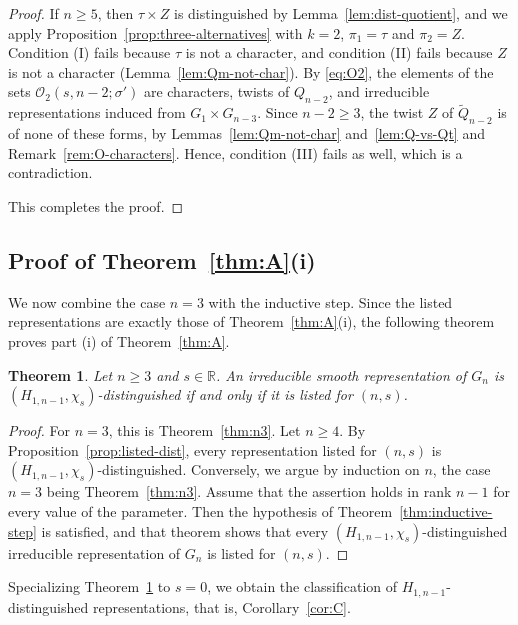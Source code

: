 \documentclass[11pt]{amsart}
\numberwithin{equation}{section}
\theoremstyle{plain}
\newtheorem{theorem}{Theorem}[section]
\theoremstyle{definition}
\theoremstyle{remark}
\newcommand{\R}{\mathbb{R}}
\newcommand{\Qt}{\widetilde{Q}}
\begin{document}
\begin{proof}
	If $n\ge5$, then $\tau\times Z$ is distinguished by Lemma~\ref{lem:dist-quotient}, and we apply Proposition~\ref{prop:three-alternatives} with $k=2$, $\pi_1=\tau$ and $\pi_2=Z$. Condition (I) fails because $\tau$ is not a character, and condition (II) fails because $Z$ is not a character (Lemma~\ref{lem:Qm-not-char}). By \eqref{eq:O2}, the elements of the sets $\mathcal O_2(s,n-2;\sigma')$ are characters, twists of $Q_{n-2}$, and irreducible representations induced from $G_1\times G_{n-3}$. Since $n-2\ge3$, the twist $Z$ of $\Qt_{n-2}$ is of none of these forms, by Lemmas~\ref{lem:Qm-not-char} and~\ref{lem:Q-vs-Qt} and Remark~\ref{rem:O-characters}. Hence, condition (III) fails as well, which is a contradiction.
	
	This completes the proof.
\end{proof}

\subsection{Proof of Theorem~\ref{thm:A}(i)}\label{ss:proof-Ai}

We now combine the case $n=3$ with the inductive step. Since the listed representations are exactly those of Theorem~\ref{thm:A}(i), the following theorem proves part (i) of Theorem~\ref{thm:A}.

\begin{theorem}\label{thm:classification-all}
	Let $n\ge3$ and $s\in\R$. An irreducible smooth representation of $G_n$ is $(H_{1,n-1},\chi_s)$-distinguished if and only if it is listed for $(n,s)$.
\end{theorem}

\begin{proof}
	For $n=3$, this is Theorem~\ref{thm:n3}. Let $n\ge4$. By Proposition~\ref{prop:listed-dist}, every representation listed for $(n,s)$ is $(H_{1,n-1},\chi_s)$-distinguished. Conversely, we argue by induction on $n$, the case $n=3$ being Theorem~\ref{thm:n3}. Assume that the assertion holds in rank $n-1$ for every value of the parameter. Then the hypothesis of Theorem~\ref{thm:inductive-step} is satisfied, and that theorem shows that every $(H_{1,n-1},\chi_s)$-distinguished irreducible representation of $G_n$ is listed for $(n,s)$.
\end{proof}

Specializing Theorem~\ref{thm:classification-all} to $s=0$, we obtain the classification of $H_{1,n-1}$-distinguished representations, that is, Corollary~\ref{cor:C}.
\end{document}
